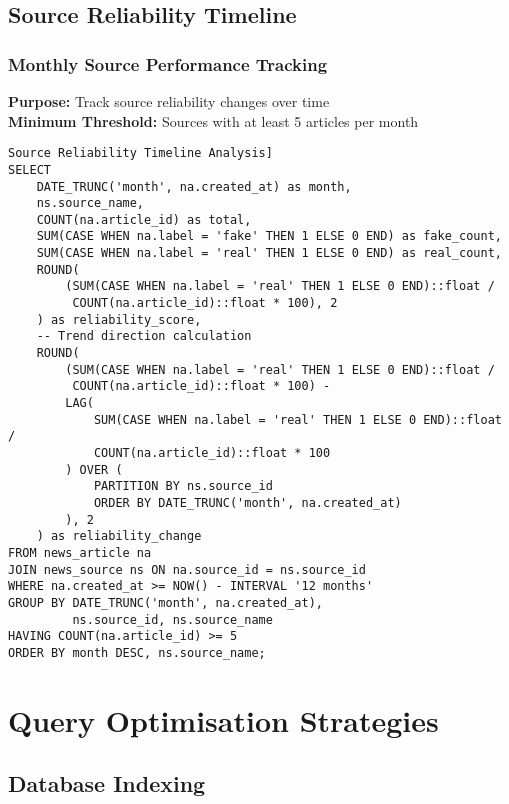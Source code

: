 \documentclass[11pt,a4paper]{article}
\begin{document}
\subsection{Source Reliability Timeline}

\subsubsection{Monthly Source Performance Tracking}
\textbf{Purpose:} Track source reliability changes over time\\
\textbf{Minimum Threshold:} Sources with at least 5 articles per month

\begin{verbatim}Source Reliability Timeline Analysis]
SELECT 
    DATE_TRUNC('month', na.created_at) as month,
    ns.source_name,
    COUNT(na.article_id) as total,
    SUM(CASE WHEN na.label = 'fake' THEN 1 ELSE 0 END) as fake_count,
    SUM(CASE WHEN na.label = 'real' THEN 1 ELSE 0 END) as real_count,
    ROUND(
        (SUM(CASE WHEN na.label = 'real' THEN 1 ELSE 0 END)::float / 
         COUNT(na.article_id)::float * 100), 2
    ) as reliability_score,
    -- Trend direction calculation
    ROUND(
        (SUM(CASE WHEN na.label = 'real' THEN 1 ELSE 0 END)::float / 
         COUNT(na.article_id)::float * 100) - 
        LAG(
            SUM(CASE WHEN na.label = 'real' THEN 1 ELSE 0 END)::float / 
            COUNT(na.article_id)::float * 100
        ) OVER (
            PARTITION BY ns.source_id 
            ORDER BY DATE_TRUNC('month', na.created_at)
        ), 2
    ) as reliability_change
FROM news_article na
JOIN news_source ns ON na.source_id = ns.source_id
WHERE na.created_at >= NOW() - INTERVAL '12 months'
GROUP BY DATE_TRUNC('month', na.created_at), 
         ns.source_id, ns.source_name
HAVING COUNT(na.article_id) >= 5
ORDER BY month DESC, ns.source_name;
\end{verbatim}

\section{Query Optimisation Strategies}

\subsection{Database Indexing}
\end{document}
